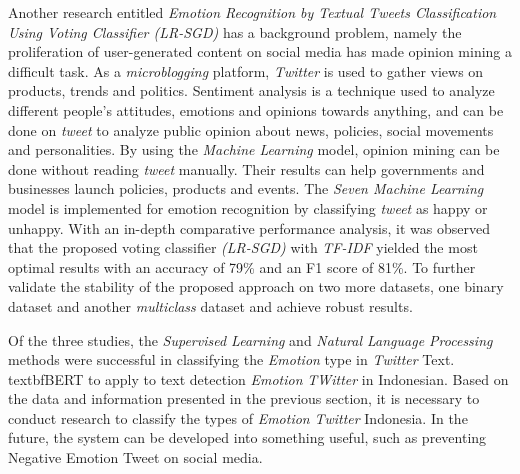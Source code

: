 Another research entitled \textit{Emotion Recognition by Textual Tweets Classification Using Voting Classifier (LR-SGD)} has a background problem, namely the proliferation of user-generated content on social media has made opinion mining a difficult task. As a \textit{microblogging} platform, \textit{Twitter} is used to gather views on products, trends and politics. Sentiment analysis is a technique used to analyze different people's attitudes, emotions and opinions towards anything, and can be done on \textit{tweet} to analyze public opinion about news, policies, social movements and personalities. By using the \textit{Machine Learning} model, opinion mining can be done without reading \textit{tweet} manually. Their results can help governments and businesses launch policies, products and events. The \textit{Seven Machine Learning} model is implemented for emotion recognition by classifying \textit{tweet} as happy or unhappy. With an in-depth comparative performance analysis, it was observed that the proposed voting classifier \textit{(LR-SGD)} with \textit{TF-IDF} yielded the most optimal results with an accuracy of 79\% and an F1 score of 81\%. To further validate the stability of the proposed approach on two more datasets, one binary dataset and another \textit{multiclass} dataset and achieve robust results.

Of the three studies, the \textit{Supervised Learning} and \textit{Natural Language Processing} methods were successful in classifying the \textit{Emotion} type in \textit{Twitter} Text. textbf{BERT} to apply to text detection \textit{Emotion} \textit{TWitter} in Indonesian. Based on the data and information presented in the previous section, it is necessary to conduct research to classify the types of \textit{Emotion}
\textit{Twitter} Indonesia. In the future, the system can be developed into something useful, such as preventing Negative Emotion Tweet on social media.